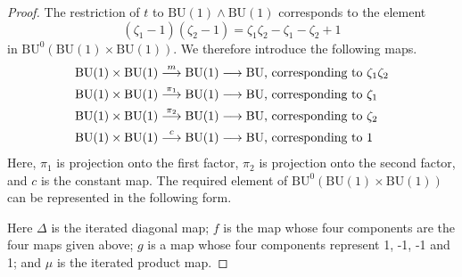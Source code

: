\documentclass[../main]{subfiles}
\begin{document}
\begin{proof}
The restriction of $t$ to $\mathrm{BU}(1)\wedge\mathrm{BU}(1)$ corresponds to the element $$(\zeta_1-1)(\zeta_2-1)=\zeta_1\zeta_2-\zeta_1-\zeta_2+1$$
in $\mathrm{BU}^0(\mathrm{BU}(1)\times\mathrm{BU}(1))$. We therefore introduce the following maps.
\begin{align*}
\mathrm{BU}(1) \times \mathrm{BU}(1)\overset{m}{\longrightarrow} \mathrm{BU}(1)\longrightarrow\mathrm{BU} &\text{, corresponding to } \zeta_1\zeta_2\\
\mathrm{BU}(1)\times\mathrm{BU}(1)\overset{\pi_1}{\longrightarrow}\mathrm{BU}(1)\longrightarrow\mathrm{BU}&\text{, corresponding to } \zeta_1\\
\mathrm{BU}(1)\times\mathrm{BU}(1)\overset{\pi_2}{\longrightarrow}\mathrm{BU}(1)\longrightarrow\mathrm{BU}&\text{, corresponding to } \zeta_2\\
\mathrm{BU}(1)\times\mathrm{BU}(1)\overset{c}{\longrightarrow}\mathrm{BU}(1)\longrightarrow\mathrm{BU}&\text{, corresponding to } 1
\end{align*}
Here, $\pi_1$ is projection onto the first factor, $\pi_2$ is projection onto the second factor, and $c$ is the constant map. The required element of $\mathrm{BU}^0(\mathrm{BU}(1)\times\mathrm{BU}(1))$ can be represented in the following form.
\begin{center}
\end{center}
Here $\Delta$ is the iterated diagonal map; $f$ is the map whose four components are the four maps given above; $g$ is a map whose four components represent 1, -1, -1 and 1; and $\mu$ is the iterated product map.


\end{proof}
\end{document}
